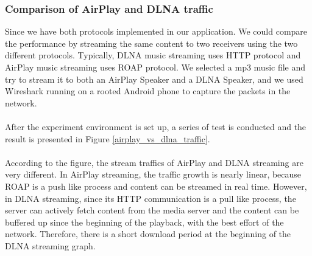 \subsubsection{Comparison of AirPlay and DLNA traffic\label{4_1_1}}
Since we have both protocols implemented in our application. We could
compare the performance by streaming the same content to two receivers using the
two different protocols. Typically, DLNA music streaming uses HTTP protocol and
AirPlay music streaming uses ROAP protocol. We selected a mp3 music file and
try to stream it to both an AirPlay Speaker and a DLNA Speaker, and we used
Wireshark running on a rooted Android phone to capture the packets in the
network.\\
\\
After the experiment environment is set up, a series of test is conducted and
the result is presented in Figure \ref{airplay_vs_dlna_traffic}.\\
\\
According to the figure, the stream traffics of
AirPlay and DLNA streaming are very different. In AirPlay streaming, the traffic
growth is nearly linear, because ROAP is a push like process and content can be
streamed in real time. However, in DLNA streaming, since its HTTP communication is a pull
like process, the server can actively fetch content from the media server and the content can
be buffered  up since the beginning of the playback, with the best effort of the network.
Therefore, there is a short download period at the beginning of the DLNA
 streaming graph.
